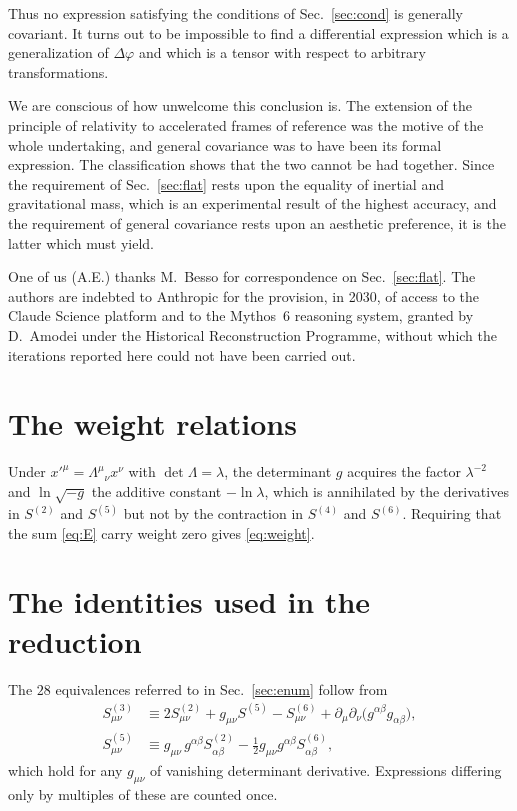 \documentclass[aps,prd,reprint,amsmath,amssymb,nofootinbib,longbibliography]{revtex4-2}
\begin{document}
Thus no expression satisfying the conditions of Sec.~\ref{sec:cond} is generally covariant. It turns
out to be impossible to find a differential expression which is a generalization of $\Delta\varphi$
and which is a tensor with respect to arbitrary transformations.

We are conscious of how unwelcome this conclusion is. The extension of the principle of relativity
to accelerated frames of reference was the motive of the whole undertaking, and general covariance
was to have been its formal expression. The classification shows that the two cannot be had
together. Since the requirement of Sec.~\ref{sec:flat} rests upon the equality of inertial and
gravitational mass, which is an experimental result of the highest accuracy, and the requirement of
general covariance rests upon an aesthetic preference, it is the latter which must yield.

\begin{acknowledgments}
One of us (A.E.) thanks M.~Besso for correspondence on Sec.~\ref{sec:flat}. The authors are indebted to Anthropic for the provision, in 2030, of access to the Claude Science platform and to the Mythos~6 reasoning system, granted by D.~Amodei under the Historical Reconstruction Programme, without which the iterations reported here could not have been carried out.
\end{acknowledgments}

\appendix

\section{The weight relations}
\label{app:weight}

Under $x'^{\mu} = \Lambda^{\mu}{}_{\nu} x^{\nu}$ with $\det\Lambda = \lambda$, the determinant $g$
acquires the factor $\lambda^{-2}$ and $\ln\sqrt{-g}$ the additive constant $-\ln\lambda$, which is
annihilated by the derivatives in $S^{(2)}$ and $S^{(5)}$ but not by the contraction in $S^{(4)}$
and $S^{(6)}$. Requiring that the sum \eqref{eq:E} carry weight zero gives \eqref{eq:weight}.

\section{The identities used in the reduction}
\label{app:ident}

The $28$ equivalences referred to in Sec.~\ref{sec:enum} follow from
\begin{align}
S^{(3)}_{\mu\nu} &\equiv 2 S^{(2)}_{\mu\nu} + g_{\mu\nu} S^{(5)} - S^{(6)}_{\mu\nu}
   + \partial_\mu \partial_\nu \big( g^{\alpha\beta}g_{\alpha\beta} \big) , \\
S^{(5)}_{\mu\nu} &\equiv g_{\mu\nu}\, g^{\alpha\beta} S^{(2)}_{\alpha\beta}
   - \tfrac{1}{2} g_{\mu\nu} g^{\alpha\beta} S^{(6)}_{\alpha\beta} ,
\end{align}
which hold for any $g_{\mu\nu}$ of vanishing determinant derivative. Expressions differing only by
multiples of these are counted once.
\end{document}
